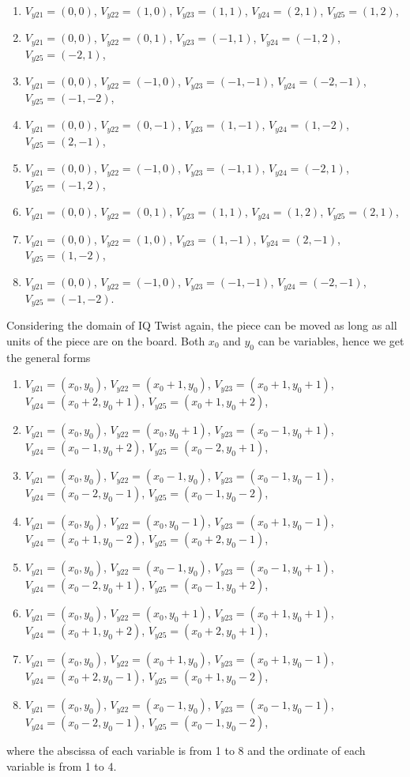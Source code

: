\begin{enumerate}
 \label{enu:eightsituation}
 \item $V_{y21}=(0,0)$, $V_{y22}=(1,0)$, $V_{y23}=(1,1)$, $V_{y24}=(2,1)$, $V_{y25}=(1,2)$,
 \item $V_{y21}=(0,0)$, $V_{y22}=(0,1)$, $V_{y23}=(-1,1)$, $V_{y24}=(-1,2)$, $V_{y25}=(-2,1)$,
 \item $V_{y21}=(0,0)$, $V_{y22}=(-1,0)$, $V_{y23}=(-1,-1)$, $V_{y24}=(-2,-1)$, $V_{y25}=(-1,-2)$,
 \item $V_{y21}=(0,0)$, $V_{y22}=(0,-1)$, $V_{y23}=(1,-1)$, $V_{y24}=(1,-2)$, $V_{y25}=(2,-1)$,
 \item $V_{y21}=(0,0)$, $V_{y22}=(-1,0)$, $V_{y23}=(-1,1)$, $V_{y24}=(-2,1)$, $V_{y25}=(-1,2)$,
 \item $V_{y21}=(0,0)$, $V_{y22}=(0,1)$, $V_{y23}=(1,1)$, $V_{y24}=(1,2)$, $V_{y25}=(2,1)$,
 \item $V_{y21}=(0,0)$, $V_{y22}=(1,0)$, $V_{y23}=(1,-1)$, $V_{y24}=(2,-1)$, $V_{y25}=(1,-2)$,
 \item $V_{y21}=(0,0)$, $V_{y22}=(-1,0)$, $V_{y23}=(-1,-1)$, $V_{y24}=(-2,-1)$, $V_{y25}=(-1,-2)$.
\end{enumerate}
Considering the domain of IQ Twist again, the piece can be moved as long as all units of the piece are on the board. Both $x_{0}$ and $y_{0}$ can be variables, hence we get the general forms 
\begin{enumerate}
 \label{enu:formuals}
 \item $V_{y21}=(x_{0},y_{0})$, $V_{y22}=(x_{0}+1,y_{0})$, $V_{y23}=(x_{0}+1,y_{0}+1)$, $V_{y24}=(x_{0}+2,y_{0}+1)$, $V_{y25}=(x_{0}+1,y_{0}+2)$,
 \item $V_{y21}=(x_{0},y_{0})$, $V_{y22}=(x_{0},y_{0}+1)$, $V_{y23}=(x_{0}-1,y_{0}+1)$, $V_{y24}=(x_{0}-1,y_{0}+2)$, $V_{y25}=(x_{0}-2,y_{0}+1)$,
 \item $V_{y21}=(x_{0},y_{0})$, $V_{y22}=(x_{0}-1,y_{0})$, $V_{y23}=(x_{0}-1,y_{0}-1)$, $V_{y24}=(x_{0}-2,y_{0}-1)$, $V_{y25}=(x_{0}-1,y_{0}-2)$,
 \item $V_{y21}=(x_{0},y_{0})$, $V_{y22}=(x_{0},y_{0}-1)$, $V_{y23}=(x_{0}+1,y_{0}-1)$, $V_{y24}=(x_{0}+1,y_{0}-2)$, $V_{y25}=(x_{0}+2,y_{0}-1)$,
 \item $V_{y21}=(x_{0},y_{0})$, $V_{y22}=(x_{0}-1,y_{0})$, $V_{y23}=(x_{0}-1,y_{0}+1)$, $V_{y24}=(x_{0}-2,y_{0}+1)$, $V_{y25}=(x_{0}-1,y_{0}+2)$,
 \item $V_{y21}=(x_{0},y_{0})$, $V_{y22}=(x_{0},y_{0}+1)$, $V_{y23}=(x_{0}+1,y_{0}+1)$, $V_{y24}=(x_{0}+1,y_{0}+2)$, $V_{y25}=(x_{0}+2,y_{0}+1)$,
 \item $V_{y21}=(x_{0},y_{0})$, $V_{y22}=(x_{0}+1,y_{0})$, $V_{y23}=(x_{0}+1,y_{0}-1)$, $V_{y24}=(x_{0}+2,y_{0}-1)$, $V_{y25}=(x_{0}+1,y_{0}-2)$,
 \item $V_{y21}=(x_{0},y_{0})$, $V_{y22}=(x_{0}-1,y_{0})$, $V_{y23}=(x_{0}-1,y_{0}-1)$, $V_{y24}=(x_{0}-2,y_{0}-1)$, $V_{y25}=(x_{0}-1,y_{0}-2)$,
\end{enumerate}
where the abscissa of each variable is from 1 to 8 and the ordinate of each variable is from 1 to 4.  
